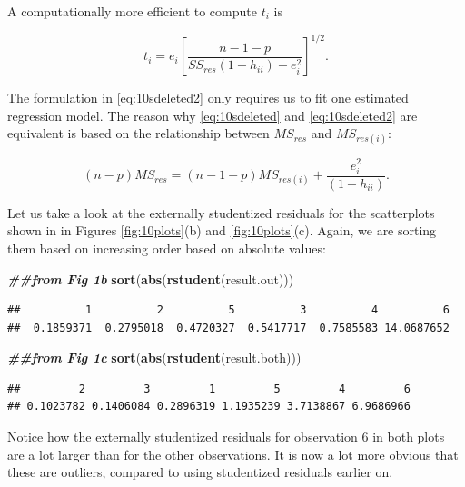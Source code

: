 \documentclass[
]{book}
\newenvironment{Shaded}{\begin{snugshade}}{\end{snugshade}}
\newcommand{\DocumentationTok}[1]{\textcolor[rgb]{0.56,0.35,0.01}{\textbf{\textit{#1}}}}
\newcommand{\FunctionTok}[1]{\textcolor[rgb]{0.13,0.29,0.53}{\textbf{#1}}}
\newcommand{\NormalTok}[1]{#1}
\begin{document}
A computationally more efficient to compute \(t_i\) is

\begin{equation} 
t_i =
e_i\left[\frac{n-1-p}{SS_{res}(1-h_{ii})-e_i^2}\right]^{1/2}.
\label{eq:10sdeleted2}
\end{equation}

The formulation in \eqref{eq:10sdeleted2} only requires us to fit one estimated regression model. The reason why \eqref{eq:10sdeleted} and \eqref{eq:10sdeleted2} are equivalent is based on the relationship between \(MS_{res}\) and \(MS_{res(i)}\):

\begin{equation} 
(n-p)MS_{res}=(n-1-p)MS_{res(i)} + \frac{e_i^2}{(1-h_{ii})}.
\label{eq:10relate}
\end{equation}

Let us take a look at the externally studentized residuals for the scatterplots shown in in Figures \ref{fig:10plots}(b) and \ref{fig:10plots}(c). Again, we are sorting them based on increasing order based on absolute values:

\begin{Shaded}
\begin{Highlighting}[]
\DocumentationTok{\#\#from Fig 1b}
\FunctionTok{sort}\NormalTok{(}\FunctionTok{abs}\NormalTok{(}\FunctionTok{rstudent}\NormalTok{(result.out)))}
\end{Highlighting}
\end{Shaded}

\begin{verbatim}
##          1          2          5          3          4          6 
##  0.1859371  0.2795018  0.4720327  0.5417717  0.7585583 14.0687652
\end{verbatim}

\begin{Shaded}
\begin{Highlighting}[]
\DocumentationTok{\#\#from Fig 1c}
\FunctionTok{sort}\NormalTok{(}\FunctionTok{abs}\NormalTok{(}\FunctionTok{rstudent}\NormalTok{(result.both)))}
\end{Highlighting}
\end{Shaded}

\begin{verbatim}
##         2         3         1         5         4         6 
## 0.1023782 0.1406084 0.2896319 1.1935239 3.7138867 6.9686966
\end{verbatim}

Notice how the externally studentized residuals for observation 6 in both plots are a lot larger than for the other observations. It is now a lot more obvious that these are outliers, compared to using studentized residuals earlier on.
\end{document}
